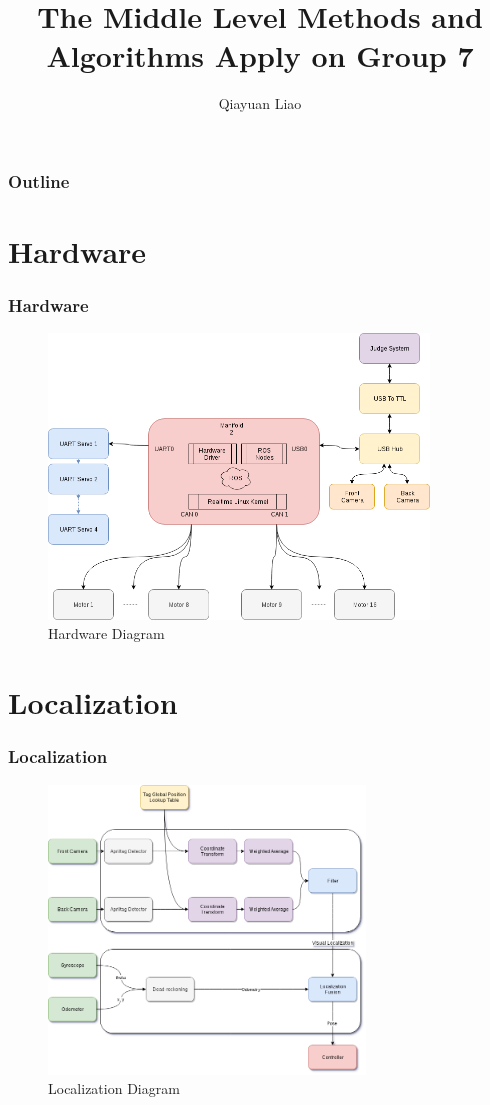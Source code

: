 \documentclass{beamer}
\title{The Middle Level Methods and Algorithms Apply on Group 7}
\author{Qiayuan Liao\inst{1}}
\institute[] %
{
  \inst{1}
  liaoqiayuan@gmail.com
}
\begin{document}
\begin{frame}
  \titlepage
\end{frame}

\begin{frame}
  \frametitle{Outline}
  \tableofcontents
\end{frame}

\section{Hardware}
\begin{frame}
  \frametitle{Hardware}
  \begin{figure}
    \includegraphics[width = 0.9\textwidth]{fig/hardware.png}
    \caption{Hardware Diagram}
  \end{figure}
\end{frame}

\section{Localization}
\begin{frame}
  \frametitle{Localization}
  \begin{figure}
    \includegraphics[width = 0.75\textwidth]{fig/vision.png}
    \caption{Localization Diagram}
  \end{figure}
\end{frame}
\end{document}
